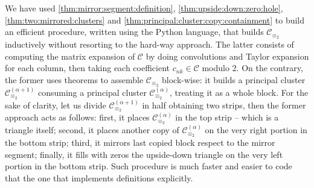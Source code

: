We have used \autoref{thm:mirror:segment:definition},
\autoref{thm:upside:down:zero:hole}, \autoref{thm:two:mirrored:clusters} and
\autoref{thm:principal:cluster:copy:containment} to build an efficient
procedure, written using the Python language, that builds $\mathcal{C}_{\equiv_{2}}$
inductively without resorting to the hard-way approach. The latter consists of 
computing the matrix expansion of $\mathcal{C}$ by doing convolutions and 
Taylor expansion for each column, then taking each coefficient $c_{nk}\in\mathcal{C}$ modulo 2. 
On the contrary, the former uses theorems to 
assemble $\mathcal{C}_{\equiv_{2}}$ block-wise: it builds a principal cluster 
$\mathcal{C}_{\equiv_{2}}^{(\alpha+1)}$ consuming a principal cluster 
$\mathcal{C}_{\equiv_{2}}^{(\alpha)}$, treating it as a whole block. For the sake of clarity,
let us divide $\mathcal{C}_{\equiv_{2}}^{(\alpha+1)}$ in half obtaining two strips, then the former approach acts as follows:
first, it places $\mathcal{C}_{\equiv_{2}}^{(\alpha)}$ in the top strip -- which is a triangle itself; 
second, it places another copy of $\mathcal{C}_{\equiv_{2}}^{(\alpha)}$ on the very right portion in the bottom strip;
third, it mirrors last copied block respect to the mirror segment; 
finally, it fills with zeros the upside-down triangle on the very left portion in the bottom strip. 
Such procedure is much faster and easier to code that the one that implements definitions explicitly.
